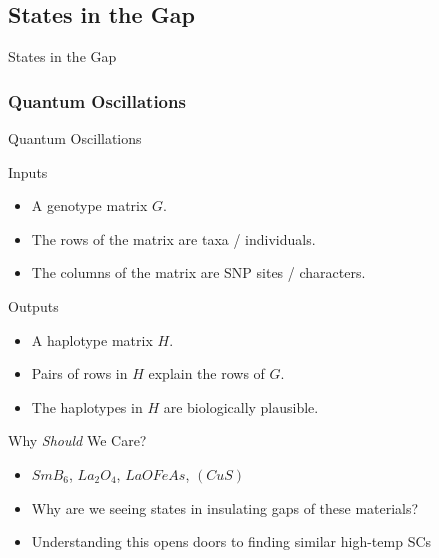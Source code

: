 \documentclass{beamer}
\begin{document}


\subsection{States in the Gap}

\begin{frame}
{States in the Gap}

        

\end{frame}




\subsubsection{Quantum Oscillations}

\begin{frame}[t]{Quantum Oscillations}
  \begin{block}{Inputs}
    \begin{itemize}
    \item A \alert{genotype matrix} $G$.
    \item The \alert{rows} of the matrix are \alert{taxa / individuals}.
    \item The \alert{columns} of the matrix are \alert{SNP sites /
        characters}. 
    \end{itemize}
  \end{block}
  \begin{block}{Outputs}
    \begin{itemize}
    \item A \alert{haplotype matrix} $H$.
    \item Pairs of rows in $H$ \alert{explain} the rows of $G$.
    \item The haplotypes in $H$ are \alert{biologically plausible}. 
    \end{itemize}
  \end{block}
\end{frame}




\begin{frame}{Why \textit{Should} We Care?}
    \begin{itemize}
        \item $Sm B_6$, $La_2 O_4$, $LaOFeAs$, $(CuS)$
        \item Why are we seeing states in insulating gaps of these materials? 
        \item Understanding this opens doors to finding similar high-temp SCs
    \end{itemize}
\end{frame}
\end{document}
